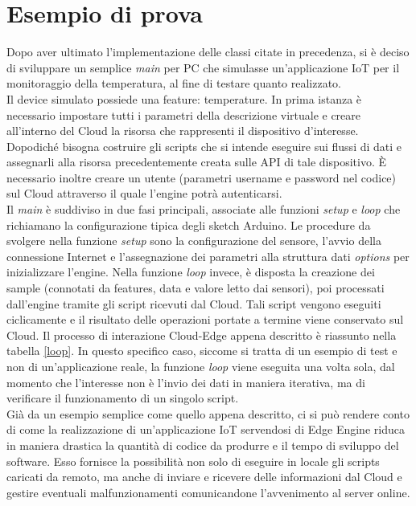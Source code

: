 \section{Esempio di prova}\label{prova}
Dopo aver ultimato l’implementazione delle classi citate in precedenza, si è deciso di sviluppare un semplice \textit{main} per PC che simulasse un’applicazione IoT per il monitoraggio della temperatura, al fine di testare quanto realizzato.\\
Il device simulato possiede una feature: temperature. In prima istanza è necessario impostare tutti i parametri della descrizione virtuale e creare all'interno del Cloud la risorsa che rappresenti il dispositivo d’interesse. Dopodiché bisogna costruire gli scripts che si intende eseguire sui flussi di dati e assegnarli alla risorsa precedentemente creata sulle API di tale dispositivo. È necessario inoltre creare un utente (parametri username e password nel codice) sul Cloud attraverso il quale l'engine potrà autenticarsi.\\
Il \textit{main} è suddiviso in due fasi principali, associate alle funzioni  \textit{setup} e  \textit{loop} che richiamano la configurazione tipica degli sketch Arduino. Le procedure da svolgere nella funzione  \textit{setup} sono la configurazione del sensore, l'avvio della connessione Internet e l'assegnazione dei parametri alla struttura dati \textit{options} per inizializzare l'engine. Nella funzione \textit{loop} invece, è disposta la creazione dei sample (connotati da features, data e valore letto dai sensori), poi processati dall'engine tramite gli script ricevuti dal Cloud. Tali script vengono eseguiti ciclicamente e il risultato delle operazioni portate a termine viene conservato sul Cloud. Il processo di interazione Cloud-Edge appena descritto è riassunto nella tabella \ref{loop}. In questo specifico caso, siccome si tratta di un esempio di test e non di un'applicazione reale, la funzione \textit{loop} viene eseguita una volta sola, dal momento che l'interesse non è l'invio dei dati in maniera iterativa, ma di verificare il funzionamento di un singolo script.\\
Già da un esempio semplice come quello appena descritto, ci si può rendere conto di come la realizzazione di un'applicazione IoT servendosi di Edge Engine riduca in maniera drastica la quantità di codice da produrre e il tempo di sviluppo del software. Esso fornisce la possibilità non solo di eseguire in locale gli scripts caricati da remoto, ma anche di inviare e ricevere delle informazioni dal Cloud e gestire eventuali malfunzionamenti comunicandone l'avvenimento al server online.
